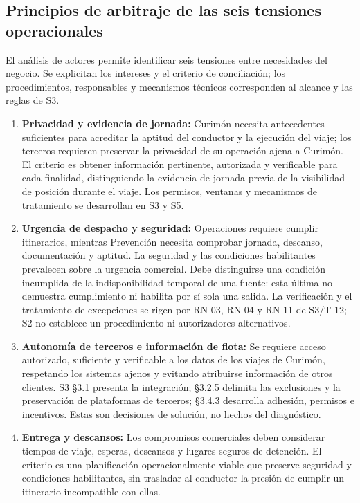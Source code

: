 \subsection{Principios de arbitraje de las seis tensiones operacionales}\label{sec:2-arbitraje}

El análisis de actores permite identificar seis tensiones entre necesidades del negocio. Se explicitan los intereses y el criterio de conciliación; los procedimientos, responsables y mecanismos técnicos corresponden al alcance y las reglas de S3.

\begin{enumerate}
  \item \textbf{Privacidad y evidencia de jornada:} Curimón necesita antecedentes suficientes para acreditar la aptitud del conductor y la ejecución del viaje; los terceros requieren preservar la privacidad de su operación ajena a Curimón. El criterio es obtener información pertinente, autorizada y verificable para cada finalidad, distinguiendo la evidencia de jornada previa de la visibilidad de posición durante el viaje. Los permisos, ventanas y mecanismos de tratamiento se desarrollan en S3 y S5.
  \item \textbf{Urgencia de despacho y seguridad:} Operaciones requiere cumplir itinerarios, mientras Prevención necesita comprobar jornada, descanso, documentación y aptitud. La seguridad y las condiciones habilitantes prevalecen sobre la urgencia comercial. Debe distinguirse una condición incumplida de la indisponibilidad temporal de una fuente: esta última no demuestra cumplimiento ni habilita por sí sola una salida. La verificación y el tratamiento de excepciones se rigen por RN-03, RN-04 y RN-11 de S3/T-12; S2 no establece un procedimiento ni autorizadores alternativos.
  \item \textbf{Autonomía de terceros e información de flota:} Se requiere acceso autorizado, suficiente y verificable a los datos de los viajes de Curimón, respetando los sistemas ajenos y evitando atribuirse información de otros clientes. S3 §3.1 presenta la integración; §3.2.5 delimita las exclusiones y la preservación de plataformas de terceros; §3.4.3 desarrolla adhesión, permisos e incentivos. Estas son decisiones de solución, no hechos del diagnóstico.
  \item \textbf{Entrega y descansos:} Los compromisos comerciales deben considerar tiempos de viaje, esperas, descansos y lugares seguros de detención. El criterio es una planificación operacionalmente viable que preserve seguridad y condiciones habilitantes, sin trasladar al conductor la presión de cumplir un itinerario incompatible con ellas.

\end{enumerate}
